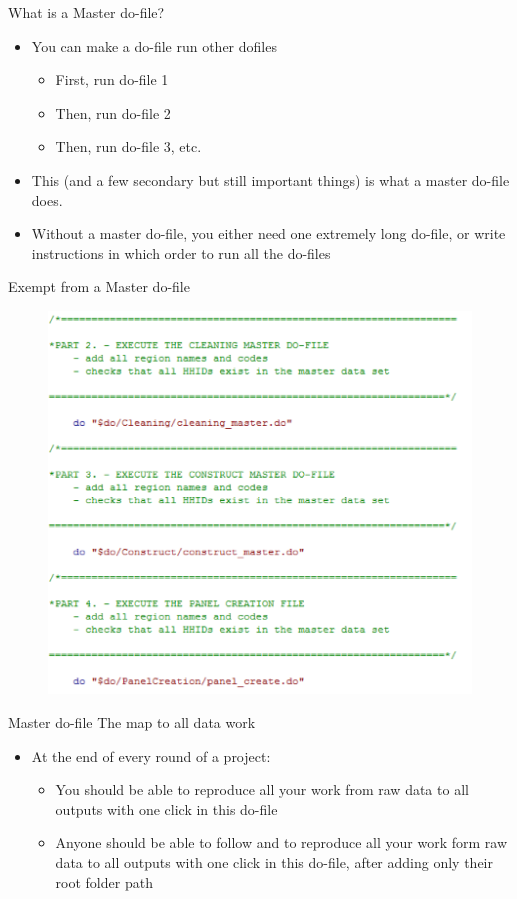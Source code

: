 \documentclass[aspectratio=169]{beamer}
\begin{document}
\begin{frame}{What is a Master do-file?}
\begin{itemize}
	\item You can make a do-file run other dofiles
		\begin{itemize}
			\item 	First, run do-file 1
			\item Then, run do-file 2 
			\item Then, run do-file 3, etc.
		\end{itemize}
	\item This (and a few secondary but still important things) is what a master do-file does.
	\item Without a master do-file, you either need one extremely long do-file, or write instructions in which order to run all the do-files
\end{itemize}
\end{frame}

\begin{frame}{Exempt from a Master do-file}
\begin{figure}
	\centering
	\includegraphics[width=\linewidth]{img/master}
\end{figure}
\end{frame}


\begin{frame}{Master do-file \newline The map to all data work}
\begin{itemize}
	\item At the end of every round of a project:
	\begin{itemize}
		\item 	You should be able to reproduce all your work from raw data to all outputs with one click in this do-file
		\item Anyone should be able to follow and to reproduce all your work form raw data to all outputs with one click in this do-file, after adding only their root folder path
	\end{itemize}
\end{itemize}
\end{frame}
\end{document}
